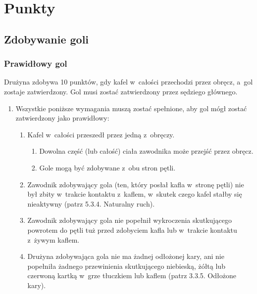 \documentclass[12pt,a4paper]{article}
\begin{document}
\pagebreak
\section{Punkty}

\subsection{Zdobywanie goli}

\subsubsection{Prawidłowy gol}
Drużyna zdobywa 10 punktów, gdy kafel w~całości przechodzi przez obręcz, a~gol zostaje zatwierdzony. Gol musi
zostać zatwierdzony przez sędziego głównego.

\begin{enumerate}
	\item
	      Wszystkie poniższe wymagania muszą zostać spełnione, aby gol mógł
	      zostać zatwierdzony jako prawidłowy:

	      \begin{enumerate}
		      \item
		            Kafel w~całości przeszedł przez jedną z~obręczy.

		            \begin{enumerate}
			            \item
			                  Dowolna część (lub całość) ciała zawodnika może przejść przez
			                  obręcz.
			            \item
			                  Gole mogą być zdobywane z~obu stron pętli.
		            \end{enumerate}
		      \item
		            Zawodnik zdobywający gola (ten, który posłał kafla w~stronę pętli)
		            nie był zbity w~trakcie kontaktu z~kaflem, w~skutek czego kafel
		            stałby się nieaktywny (patrz 5.3.4. Naturalny ruch).
		      \item
		            Zawodnik zdobywający gola nie popełnił wykroczenia skutkującego
		            powrotem do pętli tuż przed zdobyciem kafla lub w~trakcie kontaktu
		            z~żywym kaflem.
		      \item
		            Drużyna zdobywająca gola nie ma żadnej odłożonej kary, ani nie
		            popełniła żadnego przewinienia skutkującego niebieską, żółtą lub
		            czerwoną kartką w~grze tłuczkiem lub kaflem (patrz 3.3.5. Odłożone
		            kary).


\end{enumerate}
\end{enumerate}
\end{document}
